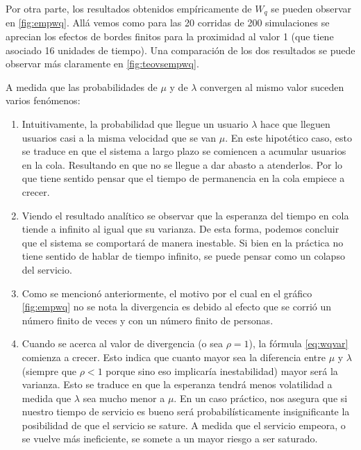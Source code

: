\documentclass{sig-alternate}
\begin{document}
Por otra parte, los resultados obtenidos emp\'iricamente de $W_q$ se pueden observar en \ref{fig:empwq}.
All\'a vemos como para las 20 corridas de 200 simulaciones se aprecian los efectos de bordes finitos para
la proximidad al valor 1 (que tiene asociado 16 unidades de tiempo).
Una comparaci\'on de los dos resultados se puede observar m\'as claramente en \ref{fig:teovsempwq}.

A medida que las probabilidades de $\mu$ y de $\lambda$ convergen al mismo valor suceden varios fen\'omenos: 
\begin{enumerate}
\item Intuitivamente, la probabilidad que llegue un usuario $\lambda$ hace que lleguen usuarios casi a la misma velocidad que se van $\mu$. En este hipotético caso, esto se traduce en que el sistema a largo plazo se comiencen a acumular usuarios en la cola. Resultando en que no se llegue a dar abasto a atenderlos. Por lo que tiene sentido pensar que el tiempo de permanencia en la cola empiece a crecer.
\item Viendo el resultado anal\'itico se observar que la esperanza del tiempo en cola tiende a infinito al igual que su varianza. De esta forma, podemos concluir que el sistema se comportará de manera inestable. Si bien en la práctica no tiene sentido de hablar de tiempo infinito, se puede pensar como un colapso del servicio.
\item Como se mencion\'o anteriormente, el motivo por el cual en el gr\'afico \ref{fig:empwq} no se nota la divergencia es debido al efecto que se corrió un número finito de veces y con un número finito de personas. 
\item Cuando se acerca al valor de divergencia (o sea $\rho=1$), la f\'ormula \ref{eq:wqvar}  comienza a crecer.
Esto indica que cuanto mayor sea la diferencia entre $\mu$ y $\lambda$ (siempre que $\rho < 1$ porque sino eso
implicar\'ia inestabilidad) mayor ser\'a la varianza.
Esto se traduce en que la esperanza tendr\'a menos volatilidad a medida que $\lambda$ sea mucho menor a $\mu$.
En un caso pr\'actico, nos asegura que si nuestro tiempo de servicio es bueno ser\'a probabil\'isticamente
insignificante la posibilidad de que el servicio se sature.
A medida que el servicio empeora, o se vuelve m\'as ineficiente, se somete a un mayor riesgo a ser saturado.


\end{enumerate}
\end{document}
